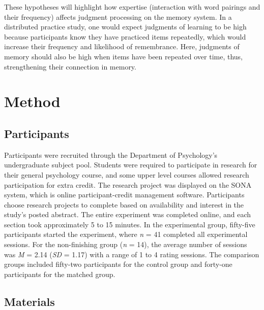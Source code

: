 \documentclass[english,man]{apa6}
\theoremstyle{definition}
\theoremstyle{definition}
\theoremstyle{definition}
\theoremstyle{remark}
\begin{document}
These hypotheses will highlight how expertise (interaction with word
pairings and their frequency) affects judgment processing on the memory
system. In a distributed practice study, one would expect judgments of
learning to be high because participants know they have practiced items
repeatedly, which would increase their frequency and likelihood of
remembrance. Here, judgments of memory should also be high when items
have been repeated over time, thus, strengthening their connection in
memory.

\section{Method}\label{method}

\subsection{Participants}\label{participants}

Participants were recruited through the Department of Psychology's
undergraduate subject pool. Students were required to participate in
research for their general psychology course, and some upper level
courses allowed research participation for extra credit. The research
project was displayed on the SONA system, which is online
participant-credit management software. Participants choose research
projects to complete based on availability and interest in the study's
posted abstract. The entire experiment was completed online, and each
section took approximately 5 to 15 minutes. In the experimental group,
fifty-five participants started the experiment, where \emph{n} = 41
completed all experimental sessions. For the non-finishing group
(\emph{n} = 14), the average number of sessions was \emph{M} = 2.14
(\emph{SD} = 1.17) with a range of 1 to 4 rating sessions. The
comparison groups included fifty-two participants for the control group
and forty-one participants for the matched group.

\subsection{Materials}\label{materials}
\end{document}
